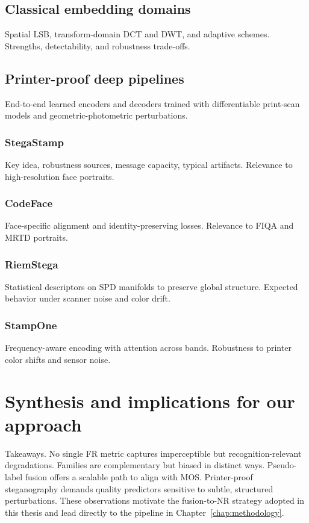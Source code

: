 \subsection{Classical embedding domains}\label{sec:steg_classical_domains}
Spatial LSB, transform-domain DCT and DWT, and adaptive schemes. Strengths, detectability, and robustness trade-offs.

\subsection{Printer-proof deep pipelines}\label{sec:steg_printer_proof}
End-to-end learned encoders and decoders trained with differentiable print-scan models and geometric-photometric perturbations.

\subsubsection{StegaStamp}
Key idea, robustness sources, message capacity, typical artifacts. Relevance to high-resolution face portraits.

\subsubsection{CodeFace}
Face-specific alignment and identity-preserving losses. Relevance to FIQA and MRTD portraits.

\subsubsection{RiemStega}
Statistical descriptors on SPD manifolds to preserve global structure. Expected behavior under scanner noise and color drift.

\subsubsection{StampOne}
Frequency-aware encoding with attention across bands. Robustness to printer color shifts and sensor noise.

\section{Synthesis and implications for our approach}\label{sec:related_synthesis}
Takeaways. No single FR metric captures imperceptible but recognition-relevant degradations. Families are complementary but biased in distinct ways. Pseudo-label fusion offers a scalable path to align with MOS. Printer-proof steganography demands quality predictors sensitive to subtle, structured perturbations. These observations motivate the fusion-to-NR strategy adopted in this thesis and lead directly to the pipeline in Chapter~\ref{chap:methodology}.

